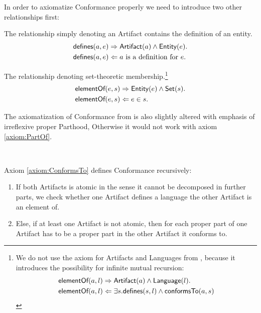 In order to axiomatize \gls{Conformance} properly we need to introduce two other relationships first:
\begin{description}[align=left]
\item[\defines]
The relationship simply denoting an \gls{Artifact} contains the definition of an entity.
\begin{align*}
\textsf{defines}(a,e)
&\Rightarrow
\textsf{Artifact}(a) \wedge \textsf{Entity}(e).\\
\textsf{defines}(a,e)
&\Leftarrow
a \text{ is a definition for } e.
\end{align*}

\item[\elementOf]
The relationship denoting set-theoretic membership.\footnote{We do not use the \elementOf axiom for \glspl{Artifact} and \glspl{Language} from \cite{HeinzLV17}, because it introduces the possibility for infinite mutual recursion:
\begin{align*}
\textsf{elementOf}(a,l)
&\Rightarrow
\textsf{Artifact}(a) \wedge \textsf{Language}(l).\\
\textsf{elementOf}(a,l)
&\Leftarrow
\exists s.\textsf{defines}(s,l) \wedge \textsf{conformsTo}(a,s)
\end{align*}}
\begin{align*}
\textsf{elementOf}(e,s)
&\Rightarrow
\textsf{Entity}(e) \wedge \textsf{Set}(s).\\
\textsf{elementOf}(e,s)
&\Leftarrow
e \in s.
\end{align*}


\end{description}


The axiomatization of \gls{Conformance} from \cite{HeinzLV17} is also slightly altered with emphasis of irreflexive proper \gls{Parthood}, Otherwise it would not work with axiom \ref{axiom:PartOf}.
\begin{axiom}[\conformsTo]
\label{axiom:ConformsTo}
~\newline
{}
\end{axiom}
Axiom \ref{axiom:ConformsTo} defines \gls{Conformance} recursively:
\begin{enumerate}[align=left,label=\textbf{Case \Roman*},ref={\Roman*}]
\item
If both \glspl{Artifact} is atomic in the sense it cannot be decomposed in further parts, we check whether one \gls{Artifact} defines a language the other \gls{Artifact} is an element of.

\item
Else, if at least one \gls{Artifact} is not atomic, then for each proper part of one \gls{Artifact} has to be a proper part in the other \gls{Artifact} it conforms to.
\end{enumerate}


